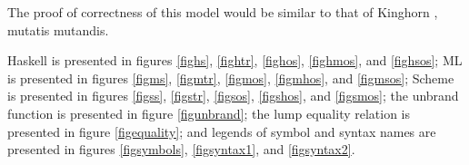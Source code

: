 The proof of correctness of this model would be similar to that of Kinghorn \cite{kinghorn07}, mutatis mutandis.

Haskell is presented in figures \ref{fighs}, \ref{fightr}, \ref{fighos}, \ref{fighmos}, and \ref{fighsos}; ML is presented in figures \ref{figms}, \ref{figmtr}, \ref{figmos}, \ref{figmhos}, and \ref{figmsos}; Scheme is presented in figures \ref{figss}, \ref{figstr}, \ref{figsos}, \ref{figshos}, and \ref{figsmos}; the unbrand function is presented in figure \ref{figunbrand}; the lump equality relation is presented in figure \ref{figequality}; and legends of symbol and syntax names are presented in figures \ref{figsymbols}, \ref{figsyntax1}, and \ref{figsyntax2}.

\clearpage



\clearpage



\clearpage



\clearpage



\clearpage



\clearpage



\clearpage



\clearpage



\clearpage



\clearpage



\clearpage



\clearpage



\clearpage



\clearpage



\clearpage



\clearpage



\clearpage



\clearpage



\clearpage



\clearpage